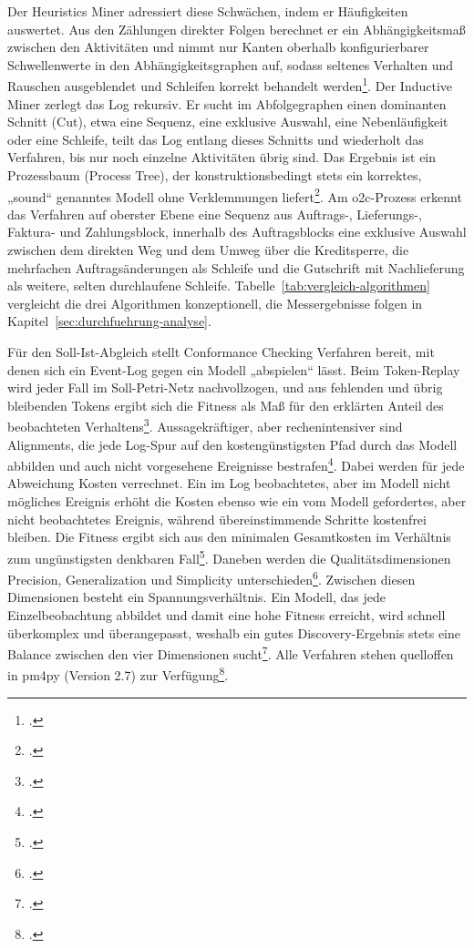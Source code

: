 Der Heuristics Miner adressiert diese Schwächen, indem er Häufigkeiten auswertet. Aus den Zählungen direkter Folgen berechnet er ein Abhängigkeitsmaß zwischen den Aktivitäten und nimmt nur Kanten oberhalb konfigurierbarer Schwellenwerte in den Abhängigkeitsgraphen auf, sodass seltenes Verhalten und Rauschen ausgeblendet und Schleifen korrekt behandelt werden\footcite[Vgl.][S.~151 ff.]{weijters2003rediscovering}. Der Inductive Miner zerlegt das Log rekursiv. Er sucht im Abfolgegraphen einen dominanten Schnitt (Cut), etwa eine Sequenz, eine exklusive Auswahl, eine Nebenläufigkeit oder eine Schleife, teilt das Log entlang dieses Schnitts und wiederholt das Verfahren, bis nur noch einzelne Aktivitäten übrig sind. Das Ergebnis ist ein Prozessbaum (Process Tree), der konstruktionsbedingt stets ein korrektes, „sound“ genanntes Modell ohne Verklemmungen liefert\footcite[Vgl.][S.~311 ff.]{leemans2013inductive}. Am \gls{o2c}-Prozess erkennt das Verfahren auf oberster Ebene eine Sequenz aus Auftrags-, Lieferungs-, Faktura- und Zahlungsblock, innerhalb des Auftragsblocks eine exklusive Auswahl zwischen dem direkten Weg und dem Umweg über die Kreditsperre, die mehrfachen Auftragsänderungen als Schleife und die Gutschrift mit Nachlieferung als weitere, selten durchlaufene Schleife. Tabelle~\ref{tab:vergleich-algorithmen} vergleicht die drei Algorithmen konzeptionell, die Messergebnisse folgen in Kapitel~\ref{sec:durchfuehrung-analyse}.

Für den Soll-Ist-Abgleich stellt Conformance Checking Verfahren bereit, mit denen sich ein Event-Log gegen ein Modell „abspielen“ lässt. Beim Token-Replay wird jeder Fall im Soll-Petri-Netz nachvollzogen, und aus fehlenden und übrig bleibenden Tokens ergibt sich die Fitness als Maß für den erklärten Anteil des beobachteten Verhaltens\footcite[Vgl.][S.~64 ff.]{rozinat2008conformance}. Aussagekräftiger, aber rechenintensiver sind Alignments, die jede Log-Spur auf den kostengünstigsten Pfad durch das Modell abbilden und auch nicht vorgesehene Ereignisse bestrafen\footcite[Vgl.][S.~182 ff.]{vanderaalst2012replaying}. Dabei werden für jede Abweichung Kosten verrechnet. Ein im Log beobachtetes, aber im Modell nicht mögliches Ereignis erhöht die Kosten ebenso wie ein vom Modell gefordertes, aber nicht beobachtetes Ereignis, während übereinstimmende Schritte kostenfrei bleiben. Die Fitness ergibt sich aus den minimalen Gesamtkosten im Verhältnis zum ungünstigsten denkbaren Fall\footcite[Vgl.][S.~182 ff.]{vanderaalst2012replaying}. Daneben werden die Qualitätsdimensionen Precision, Generalization und Simplicity unterschieden\footcite[Vgl.][S.~188 ff.\ und S.~243 ff.]{vanderaalst2016processmining}. Zwischen diesen Dimensionen besteht ein Spannungsverhältnis. Ein Modell, das jede Einzelbeobachtung abbildet und damit eine hohe Fitness erreicht, wird schnell überkomplex und überangepasst, weshalb ein gutes Discovery-Ergebnis stets eine Balance zwischen den vier Dimensionen sucht\footcite[Vgl.][S.~305 ff.]{buijs2012role}. Alle Verfahren stehen quelloffen in \gls{pm4py} (Version 2.7) zur Verfügung\footcites(Vgl.)()[]{berti2019pm4py}[S.~21 ff.]{peters2019processmining}[S.~3 ff.]{reinkemeyer2020processmining}.

